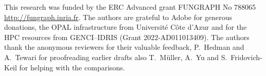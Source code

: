 \documentclass[acmtog]{acmart}
\begin{document}









\begin{acks}
This research was funded by the ERC Advanced grant FUNGRAPH No 788065 \textcolor{blue}{\url{http://fungraph.inria.fr}}. The authors are grateful to Adobe for generous donations, the OPAL infrastructure from Université Côte d’Azur  and for the HPC resources from GENCI–IDRIS (Grant 2022-AD011013409). The authors thank the anonymous reviewers for their valuable feedback, P.\ Hedman and A.\ Tewari for proofreading earlier drafts also T.\ Müller, A.\ Yu and S.\ Fridovich-Keil for helping with the comparisons. 
\end{acks}





\end{document}
